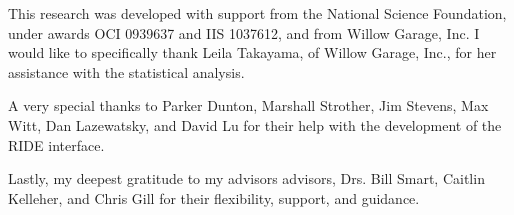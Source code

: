\begin{thesisacknowledgments}
This research was developed with support from the National Science Foundation, under awards OCI 0939637 and IIS 1037612, and from Willow Garage, Inc. I would like to specifically thank Leila Takayama, of Willow Garage, Inc., for her assistance with the statistical analysis.

A very special thanks to Parker Dunton, Marshall Strother, Jim Stevens, Max Witt, Dan Lazewatsky, and David Lu for their help with the development of the RIDE interface.

Lastly, my deepest gratitude to my advisors advisors, Drs. Bill Smart, Caitlin Kelleher, and Chris Gill for their flexibility, support, and guidance.
\end{thesisacknowledgments}

\begin{thesisdedicationpage}                %
\end{thesisdedicationpage}

\begin{singlespace}
\tableofcontents

\iffalse
\renewcommand{\listoftablespostscript}{
\small
\textbf{Note:} Be consistent in aligning multi-lined table-names, figure-names,
and chapter/section-names throughout your document.  It is generally
recommended to make sure any additional lines (i.e., within a long title or a
long table name) wrap and align immediately under the 1st character of the
title or name with which they are associated in the line immediately above ---
as shown in the ``Table 2.1'' example above.   Whatever approach you take, be
consistent.}
\fi

\listoftables

\listoffigures
\end{singlespace}

	



